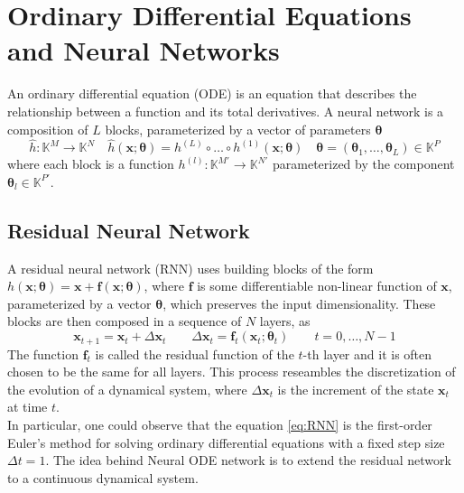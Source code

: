 \section{Ordinary Differential Equations and Neural Networks}
An ordinary differential equation (ODE) is an equation that describes the relationship between a function and its total derivatives.
A neural network is a composition of $L$ blocks, parameterized by a vector of parameters $\boldsymbol{\theta}$
$$ \hat{h}: \mathbb{K}^{M} \to \mathbb{K}^{N} \quad 
\hat{h}(\mathbf{x}; \boldsymbol{\theta}) = h^{(L)} \circ \dots \circ h^{(1)}(\mathbf{x}; \boldsymbol{\theta}) \quad 
\boldsymbol{\theta} = (\boldsymbol{\theta}_{1}, \dots, \boldsymbol{\theta}_{L}) \in \mathbb{K}^{P} $$
where each block is a function $h^{(l)}: \mathbb{K}^{M'} \to \mathbb{K}^{N'}$ parameterized by the component $\boldsymbol{\theta}_{l} \in \mathbb{K}^{P'}$.

\subsection{Residual Neural Network}
A residual neural network (RNN) uses building blocks of the form $h(\mathbf{x}; \boldsymbol{\theta}) = \mathbf{x} + \mathbf{f}(\mathbf{x}; \boldsymbol{\theta})$, where 
$\mathbf{f}$ is some differentiable non-linear function of $\mathbf{x}$, parameterized by a vector $\boldsymbol{\theta}$, which preserves the input dimensionality. 
These blocks are then composed in a sequence of $N$ layers, as
\begin{equation}
	\label{eq:RNN}
	\mathbf{x}_{t+1} = \mathbf{x}_{t} + \Delta \mathbf{x}_{t} \qquad \Delta \mathbf{x}_{t} = \mathbf{f}_{t}(\mathbf{x}_{t}; \boldsymbol{\theta}_{t}) \qquad t=0, \dots, N-1
\end{equation}
The function $\mathbf{f}_{t}$ is called the residual function of the $t$-th layer and it is often chosen to be the same for all layers.
This process reseambles the discretization of the evolution of a dynamical system, where $\Delta \mathbf{x}_{t}$ is the increment of the state $\mathbf{x}_{t}$ at time $t$. \\
In particular, one could observe that the equation \eqref{eq:RNN} is the first-order Euler's method for solving ordinary differential equations with a fixed step size $\Delta t = 1$.
The idea behind Neural ODE network is to extend the residual network to a continuous dynamical system. 

